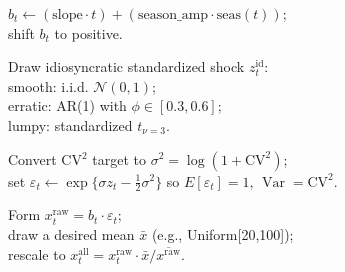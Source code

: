 \documentclass[
  authoryear,
  doubleblind,
  3p]{elsarticle}
\begin{document}
\begin{algorithm}[H]
{  
  $b_t \leftarrow (\text{slope}\cdot t) + (\text{season\_amp}\cdot \text{seas}(t))$; \\
  shift $b_t$ to positive.\;

  Draw idiosyncratic standardized shock $z^{\text{id}}_t$: \\
  \hspace*{1em} smooth: i.i.d. $\mathcal{N}(0,1)$; \\
  \hspace*{1em} erratic: AR(1) with $\phi \in [0.3,0.6]$; \\
  \hspace*{1em} lumpy: standardized $t_{\nu=3}$.\;
  
  \;

  Convert CV$^2$ target to $\sigma^2 = \log(1+\text{CV}^2)$; \\
  set $\varepsilon_t \leftarrow \exp\{\sigma z_t - \tfrac{1}{2}\sigma^2\}$ so $E[\varepsilon_t]=1$, $\operatorname{Var}=\text{CV}^2$.\;

  Form $x^{\text{raw}}_t = b_t \cdot \varepsilon_t$; \\
  draw a desired mean $\bar{x}$ (e.g., Uniform[20,100]); \\
  rescale to $x^{\text{all}}_t = x^{\text{raw}}_t \cdot \bar{x} / \overline{x^{\text{raw}}}$.\;
}
\end{algorithm}
\end{document}
